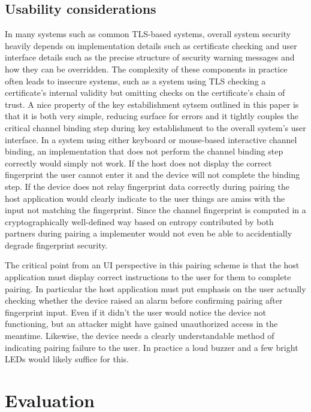 \documentclass[12pt,a4paper,notitlepage]{article}
\begin{document}
\subsection{Usability considerations}
In many systems such as common TLS-based systems, overall system security heavily depends on implementation details such
as certificate checking and user interface details such as the precise structure of security warning messages and how
they can be overridden. The complexity of these components in practice often leads to insecure systems, such as a system
using TLS checking a certificate's internal validity but omitting checks on the certificate's chain of trust. A nice
property of the key estabilishment sytsem outlined in this paper is that it is both very simple, reducing surface for
errors and it tightly couples the critical channel binding step during key establishment to the overall system's user
interface. In a system using either keyboard or mouse-based interactive channel binding, an implementation that does not
perform the channel binding step correctly would simply not work. If the host does not display the correct fingerprint
the user cannot enter it and the device will not complete the binding step. If the device does not relay fingerprint
data correctly during pairing the host application would clearly indicate to the user things are amiss with the input
not matching the fingerprint.  Since the channel fingerprint is computed in a cryptographically well-defined way based
on entropy contributed by both partners during pairing a implementer would not even be able to accidentially degrade
fingerprint security.

The critical point from an UI perspective in this pairing scheme is that the host application must display correct
instructions to the user for them to complete pairing. In particular the host application must put emphasis on the user
actually checking whether the device raised an alarm before confirming pairing after fingerprint input. Even if it
didn't the user would notice the device not functioning, but an attacker might have gained unauthorized access in the
meantime. Likewise, the device needs a clearly understandable method of indicating pairing failure to the user. In
practice a loud buzzer and a few bright LEDs would likely suffice for this.

\section{Evaluation}
\end{document}

